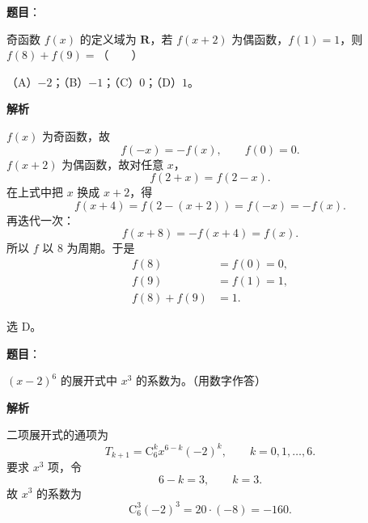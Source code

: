 \begin{answer}

\textbf{题目}：

奇函数 $f(x)$ 的定义域为 $\mathbf R$，若 $f(x+2)$ 为偶函数，$f(1)=1$，则 $f(8)+f(9)=$\mbox{（　　）}

（A）$-2$；（B）$-1$；（C）$0$；（D）$1$。

\textbf{解析}

$f(x)$ 为奇函数，故
\nopagebreak[4]
\[f(-x)=-f(x),\qquad f(0)=0.\]
$f(x+2)$ 为偶函数，故对任意 $x$，
\nopagebreak[4]
\[f(2+x)=f(2-x).\]
在上式中把 $x$ 换成 $x+2$，得
\nopagebreak[4]
\[f(x+4)=f(2-(x+2))=f(-x)=-f(x).\]
再迭代一次：
\nopagebreak[4]
\[f(x+8)=-f(x+4)=f(x).\]
所以 $f$ 以 $8$ 为周期。于是
\nopagebreak[4]
\[\begin{aligned}
f(8)&=f(0)=0,\\
f(9)&=f(1)=1,\\
f(8)+f(9)&=1.
\end{aligned}\]

选 D。


\end{answer}
\begin{answer}

\textbf{题目}：

$(x-2)^6$ 的展开式中 $x^3$ 的系数为\gkblank{}。（用数字作答）

\textbf{解析}

二项展开式的通项为
\nopagebreak[4]
\[T_{k+1}=\mathrm C_6^k x^{6-k}(-2)^k,\qquad k=0,1,\dots,6.\]
要求 $x^3$ 项，令
\nopagebreak[4]
\[6-k=3,\qquad k=3.\]
故 $x^3$ 的系数为
\nopagebreak[4]
\[\mathrm C_6^3(-2)^3=20\cdot(-8)=-160.\]


\end{answer}
